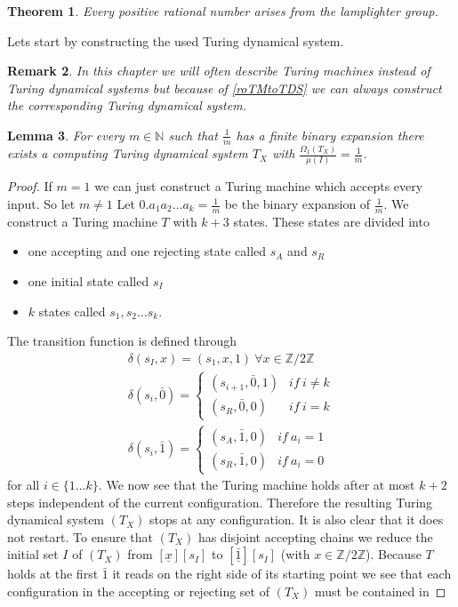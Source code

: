 \documentclass[12pt,a4paper]{scrartcl}
\theoremstyle{plain}
\newtheorem{Theorem}{Theorem}[section]
\newtheorem{Lemma}[Theorem]{Lemma}
\newtheorem{Remark}[Theorem]{Remark}
\theoremstyle{definition}
\numberwithin{equation}{section}
\newcommand{\N}{\mathbb{N}} %
\newcommand{\2}{\mathbb{Z} / 2 \mathbb{Z}}
\newcommand{\1}{\bar{1}}
\newcommand{\0}{\bar{0}}
\begin{document}
\begin{Theorem} \label{mainTh}
	Every positive rational number arises from the lamplighter group.
\end{Theorem}
Lets start by constructing the used Turing dynamical system. 
\begin{Remark}
	In this chapter we will often describe Turing machines instead of Turing dynamical systems but because of \ref{roTMtoTDS} we can always construct the corresponding Turing dynamical system.
\end{Remark}
\begin{Lemma} \label{1TM}
	For every $m \in \N$ such that $\frac{1}{m}$ has a finite binary expansion there exists a computing Turing dynamical system $T_X$ with $\frac{\Omega_1(T_X)}{\mu(I)} = \frac{1}{m}$.
\end{Lemma}
\begin{proof}
	If $m = 1$ we can just construct a Turing machine which accepts every input. So let $m \neq 1$
	Let $0. a_1 a_2 \ldots a_k = \frac{1}{m}$ be the binary expansion of $\frac{1}{m}$. We construct a Turing machine $T$ with $k+3$ states. These states are divided into
	\begin{itemize}
		\item one accepting and one rejecting state called $s_A$ and $s_R$
		\item one initial state called $s_I$
		\item $k$ states called $s_1, s_2 \ldots s_k$.
	\end{itemize}
	The transition function is defined through 
	\begin{align*}
		\delta(s_I, x) = (s_1, x, 1) \ \forall x \in \2 \\
		\delta(s_i, \0) = \begin{cases}
			(s_{i+1}, \0, 1) & if \ i \neq k \\
			(s_R, \0, 0) & if \ i = k
		\end{cases} \\
		\delta(s_i, \1) = \begin{cases}
			(s_A, \1, 0) & if \ a_i = 1 \\
			(s_R, \1, 0) & if \ a_i = 0
		\end{cases}
	\end{align*}
	for all $i \in \{1 \ldots k\}$.	We now see that the Turing machine holds after at most $k+2$ steps independent of the current configuration. Therefore the resulting Turing dynamical system $(T_X)$ stops at any configuration. It is also clear that it does not restart. To ensure that $(T_X)$ has disjoint accepting chains we reduce the initial set $I$ of $(T_X)$ from $[\underline{x}][s_I]$ to $[\underline{\1}][s_I]$ (with $x \in \2$). Because $T$ holds at the first $\1$ it reads on the right side of its starting point we see that each configuration in the accepting or rejecting set of $(T_X)$ must be contained in

\end{proof}
\end{document}

